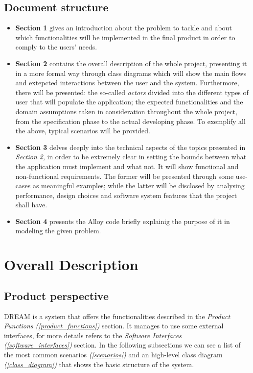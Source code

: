 \documentclass[table, 12pt]{article}
\begin{document}
\subsection{Document structure}
\begin{itemize}
    \item \textbf{Section 1} gives an introduction about the problem to tackle and about which functionalities will be implemented in the final product in order to comply to the users' needs.
    \item \textbf{Section 2} contains the overall description of the whole project, presenting it in a more formal way through class diagrams which will show the main flows and extepcted interactions between the user and the system. Furthermore, there will be presented: the so-called \emph{actors} divided into the different types of user that will populate the application; the expected functionalities and the domain assumptions taken in consideration throughout the whole project, from the specification phase to the actual developing phase. To exemplify all the above, typical scenarios will be provided.
    \item \textbf{Section 3} delves deeply into the technical aspects of the topics presented in \emph{Section 2}, in order to be extremely clear in setting the bounds between what the application must implement and what not. It will show functional and non-functional requirements. The former will be presented through some use-cases as meaningful examples; while the latter will be disclosed by analysing performance, design choices and software system features that the project shall have.
    \item \textbf{Section 4} presents the Alloy code briefly explainig the purpose of it in modeling the given problem.
\end{itemize}
\newpage
\section{Overall Description}
\subsection{Product perspective}
DREAM is a system that offers the functionalities described in the \textit{Product Functions (\ref{product_functions})} section.
It manages to use some external interfaces, for more details refers to the \textit{Software Interfaces (\ref{software_interfaces})} section.
In the following subsections we can see a list of the most common scenarios \textit{(\ref{scenarios})} and an high-level class diagram \textit{(\ref{class_diagram})} that shows the basic structure of the system.
\end{document}
